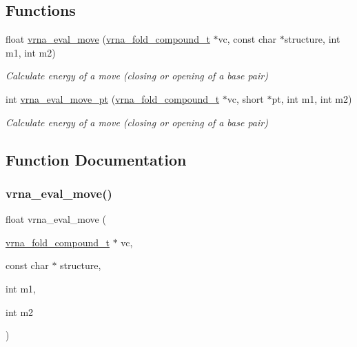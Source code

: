 \subsection*{Functions}
\begin{DoxyCompactItemize}
\item 
float \hyperlink{group__eval__move_gaff1b9e4f4d17b434b0a822fe783672c1}{vrna\+\_\+eval\+\_\+move} (\hyperlink{group__fold__compound_ga1b0cef17fd40466cef5968eaeeff6166}{vrna\+\_\+fold\+\_\+compound\+\_\+t} $\ast$vc, const char $\ast$structure, int m1, int m2)
\begin{DoxyCompactList}\small\item\em Calculate energy of a move (closing or opening of a base pair) \end{DoxyCompactList}\item 
int \hyperlink{group__eval__move_ga123dabc119ea98c968a5e903cc46f0fb}{vrna\+\_\+eval\+\_\+move\+\_\+pt} (\hyperlink{group__fold__compound_ga1b0cef17fd40466cef5968eaeeff6166}{vrna\+\_\+fold\+\_\+compound\+\_\+t} $\ast$vc, short $\ast$pt, int m1, int m2)
\begin{DoxyCompactList}\small\item\em Calculate energy of a move (closing or opening of a base pair) \end{DoxyCompactList}\end{DoxyCompactItemize}


\subsection{Function Documentation}
\mbox{\label{group__eval__move_gaff1b9e4f4d17b434b0a822fe783672c1}} 
\subsubsection{\texorpdfstring{vrna\+\_\+eval\+\_\+move()}{vrna\_eval\_move()}}
{\footnotesize\ttfamily float vrna\+\_\+eval\+\_\+move (\begin{DoxyParamCaption}\item[{\hyperlink{group__fold__compound_ga1b0cef17fd40466cef5968eaeeff6166}{vrna\+\_\+fold\+\_\+compound\+\_\+t} $\ast$}]{vc,  }\item[{const char $\ast$}]{structure,  }\item[{int}]{m1,  }\item[{int}]{m2 }\end{DoxyParamCaption})}



